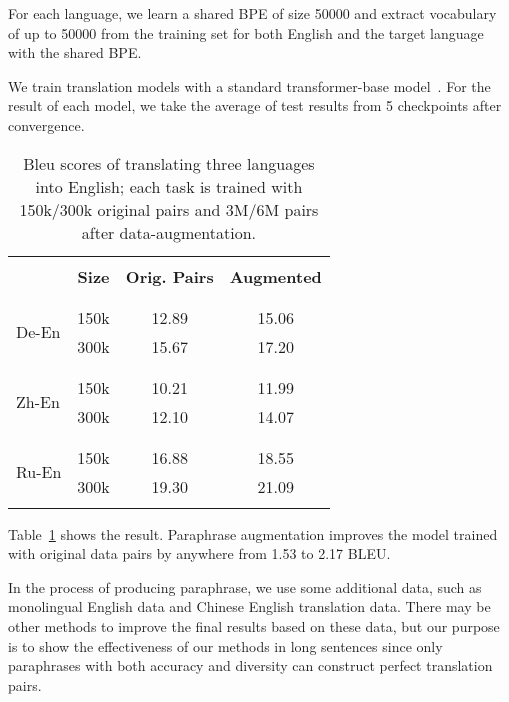 For each language, we learn a shared BPE of size 50000 
and extract vocabulary of up to 
50000 from the training set for both English and the target language 
with the shared BPE. 

We train translation models with a standard 
transformer-base model~\citep{vaswani2017attention}. 
For the result of each model, we take the average of test results from 5 checkpoints after convergence.

\begin{table}
\centering
\small
\begin{tabular}{p{1cm}ccc}
\hline
\\ [-1.8ex]
& \textbf{Size} & \textbf{Orig. Pairs} & \textbf{Augmented} \\
\\ [-1.8ex]
\cline{2-4} 
\\ [-1.8ex]
\multirow{2}{1cm}{De-En} & 150k & 12.89 & 15.06 \\
& 300k & 15.67 & 17.20 \\
\\ [-1.8ex]
\hline
\\ [-1.8ex]
\multirow{2}{1cm}{Zh-En} & 150k & 10.21 & 11.99 \\
& 300k & 12.10 & 14.07 \\
\\ [-1.8ex]
\hline
\\ [-1.8ex]
\multirow{2}{1cm}{Ru-En} & 150k & 16.88 & 18.55 \\
& 300k & 19.30 & 21.09 \\
\\ [-1.8ex]
\hline
\end{tabular}
\caption{\label{tab:augment}
Bleu scores of translating three languages into English; 
each task is trained with 150k/300k original pairs 
and 3M/6M pairs after data-augmentation.}
\end{table}

Table~\ref{tab:augment} shows the result. 
Paraphrase augmentation improves the model trained with original data pairs 
by anywhere from 1.53 to 2.17 BLEU. 

In the process of producing paraphrase, we use some additional data, such as monolingual English data and Chinese English translation data. There may be other methods to improve the final results based on these data, but our purpose is to show the effectiveness of our methods in long sentences since only paraphrases with both accuracy and diversity can construct perfect translation pairs.

